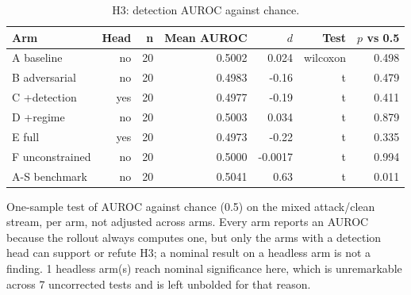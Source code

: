 \begin{table}[htbp]
  \centering
  \caption{H3: detection AUROC against chance.}
  \label{tab:auroc}
  \begin{tabular}{lrrrrrr}
    \toprule
    Arm & Head & n & Mean AUROC & $d$ & Test & $p$ vs 0.5 \\
    \midrule
    A  baseline & no & 20 & 0.5002 & 0.024 & wilcoxon & 0.498 \\
    B  adversarial & no & 20 & 0.4983 & -0.16 & t & 0.479 \\
    C  +detection & yes & 20 & 0.4977 & -0.19 & t & 0.411 \\
    D  +regime & no & 20 & 0.5003 & 0.034 & t & 0.879 \\
    E  full & yes & 20 & 0.4973 & -0.22 & t & 0.335 \\
    F  unconstrained & no & 20 & 0.5000 & -0.0017 & t & 0.994 \\
    A-S benchmark & no & 20 & 0.5041 & 0.63 & t & 0.011 \\
    \bottomrule
  \end{tabular}
  \begin{minipage}{\linewidth}\vspace{4pt}\footnotesize One-sample test of AUROC against chance (0.5) on the mixed attack/clean stream, per arm, not adjusted across arms. Every arm reports an AUROC because the rollout always computes one, but only the arms with a detection head can support or refute H3; a nominal result on a headless arm is not a finding. 1 headless arm(s) reach nominal significance here, which is unremarkable across 7 uncorrected tests and is left unbolded for that reason.\end{minipage}
\end{table}
